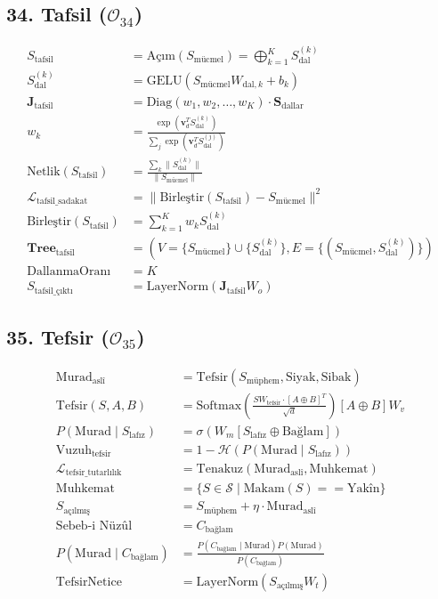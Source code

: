 \documentclass[11pt, a4paper]{article}
\begin{document}
\subsection{34. Tafsil ($\mathcal{O}_{34}$)}
\begin{align}
S_{\text{tafsil}} &= \text{Açım}(S_{\text{mücmel}}) = \bigoplus_{k=1}^K S_{\text{dal}}^{(k)} \\
S_{\text{dal}}^{(k)} &= \text{GELU}(S_{\text{mücmel}} W_{\text{dal}, k} + b_k) \\
\mathbf{J}_{\text{tafsil}} &= \text{Diag}(w_1, w_2, \dots, w_K) \cdot \mathbf{S}_{\text{dallar}} \\
w_k &= \frac{\exp(\mathbf{v}_d^T S_{\text{dal}}^{(k)})}{\sum_j \exp(\mathbf{v}_d^T S_{\text{dal}}^{(j)})} \\
\text{Netlik}(S_{\text{tafsil}}) &= \frac{\sum_k \|S_{\text{dal}}^{(k)}\|}{\|S_{\text{mücmel}}\|} \\
\mathcal{L}_{\text{tafsil\_sadakat}} &= \| \text{Birleştir}(S_{\text{tafsil}}) - S_{\text{mücmel}} \|^2 \\
\text{Birleştir}(S_{\text{tafsil}}) &= \sum_{k=1}^K w_k S_{\text{dal}}^{(k)} \\
\mathbf{Tree}_{\text{tafsil}} &= \left( V=\{S_{\text{mücmel}}\} \cup \{S_{\text{dal}}^{(k)}\}, E=\{(S_{\text{mücmel}}, S_{\text{dal}}^{(k)})\}\right) \\
\text{DallanmaOranı} &= K \\
S_{\text{tafsil\_çıktı}} &= \text{LayerNorm}(\mathbf{J}_{\text{tafsil}} W_o)
\end{align}

\subsection{35. Tefsir ($\mathcal{O}_{35}$)}
\begin{align}
\text{Murad}_{\text{aslî}} &= \text{Tefsir}(S_{\text{müphem}}, \text{Siyak}, \text{Sibak}) \\
\text{Tefsir}(S, A, B) &= \text{Softmax}\left( \frac{S W_{\text{tefsir}} \cdot [A \oplus B]^T}{\sqrt{d}} \right) [A \oplus B] W_v \\
P(\text{Murad} \mid S_{\text{lafız}}) &= \sigma( W_m [S_{\text{lafız}} \oplus \text{Bağlam}] ) \\
\text{Vuzuh}_{\text{tefsir}} &= 1 - \mathcal{H}(P(\text{Murad} \mid S_{\text{lafız}})) \\
\mathcal{L}_{\text{tefsir\_tutarlılık}} &= \text{Tenakuz}(\text{Murad}_{\text{aslî}}, \text{Muhkemat}) \\
\text{Muhkemat} &= \{ S \in \mathcal{S} \mid \text{Makam}(S) == \text{Yakîn} \} \\
S_{\text{açılmış}} &= S_{\text{müphem}} + \eta \cdot \text{Murad}_{\text{aslî}} \\
\text{Sebeb-i Nüzûl} &= C_{\text{bağlam}} \\
P(\text{Murad} \mid C_{\text{bağlam}}) &= \frac{P(C_{\text{bağlam}} \mid \text{Murad}) P(\text{Murad})}{P(C_{\text{bağlam}})} \\
\text{TefsirNetice} &= \text{LayerNorm}(S_{\text{açılmış}} W_t)
\end{align}
\end{document}

